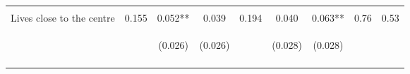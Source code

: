 \begin{table}[h!]
{\begin{tabular}{lcccccccc}
 & \begin{footnotesize}\end{footnotesize} & \begin{footnotesize}[0.017]\end{footnotesize} & \begin{footnotesize}[0.016]\end{footnotesize} & \begin{footnotesize}\end{footnotesize} & \begin{footnotesize}[0.505]\end{footnotesize} & \begin{footnotesize}[0.927]\end{footnotesize} & \begin{footnotesize}\end{footnotesize} & \begin{footnotesize}\end{footnotesize}\\
\noalign{\smallskip}Lives close to the centre & 0.155 & 0.052** & 0.039 & 0.194 & 0.040 & 0.063** & 0.76 & 0.53\\
 & \begin{footnotesize}\end{footnotesize} & \begin{footnotesize}(0.026)\end{footnotesize} & \begin{footnotesize}(0.026)\end{footnotesize} & \begin{footnotesize}\end{footnotesize} & \begin{footnotesize}(0.028)\end{footnotesize} & \begin{footnotesize}(0.028)\end{footnotesize} & \begin{footnotesize}\end{footnotesize} & \begin{footnotesize}\end{footnotesize}\\
 & \begin{footnotesize}\end{footnotesize} & \begin{footnotesize}[0.027]\end{footnotesize} & \begin{footnotesize}[0.034]\end{footnotesize} & \begin{footnotesize}\end{footnotesize} & \begin{footnotesize}[0.505]\end{footnotesize} & \begin{footnotesize}[0.136]\end{footnotesize} & \begin{footnotesize}\end{footnotesize} & \begin{footnotesize}\end{footnotesize}\\

\end{tabular}}
\end{table}
